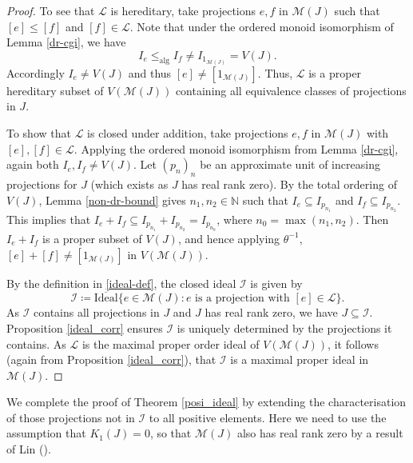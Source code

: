\documentclass[reqno]{amsart}
\theoremstyle{definition}
\theoremstyle{remark}
\numberwithin{equation}{section}
\theoremstyle{definition}
\newcommand{\calM}{\mathcal{M}}
\newcommand{\calL}{\mathcal{L}}
\newcommand{\calI}{\mathcal{I}}
\begin{document}
\begin{proof} 
To see that $\calL$ is hereditary, take projections $e, f$ in $\calM(J)$ such that $[e]\leq [f]$ and $[f]\in \calL$. Note that under the ordered monoid isomorphism of Lemma \ref{dr-cgi}, we have 
\begin{equation} 
I_{e} \leq_{\text{alg}} I_{f}\neq I_{1_{\mathcal M(J)}} = V(J). 
\end{equation} 
Accordingly $I_{e}\neq V(J)$ and thus $[e]\neq [1_{\calM(J)}]$. Thus, $\calL$ is a proper hereditary subset of $V(\calM(J))$ containing all equivalence classes of projections in $J$. 

To show that $\calL$ is closed under addition, take projections $e,f$ in $\calM(J)$ with $[e], [f]\in \calL$. Applying the ordered monoid isomorphism from Lemma \ref{dr-cgi}, again both $I_{e}, I_{f} \neq V(J)$. Let $(p_n)_n$ be an approximate unit of increasing projections for $J$ (which exists as $J$ has real rank zero). By the total ordering of $V(J)$, Lemma \ref{non-dr-bound} gives $n_{1}, n_{2}\in\mathbb N$ such that $I_{e}\subseteq I_{p_{n_{1}}}$ and $I_{f}\subseteq I_{p_{n_{2}}}$. This implies that $I_{e}+I_{f} \subseteq I_{p_{n_{1}}} + I_{p_{n_{2}}} = I_{p_{n_{0}}}$, where $n_{0}=\max(n_1,n_2)$. Then $I_e+I_f$ is a proper subset of $V(J)$, and hence applying $\theta^{-1}$, $[e]+[f]\neq [1_{\calM(J)}]$ in $V(\calM(J))$. 

By the definition in \eqref{ideal-def}, the closed ideal $\calI$ is given by 
\begin{equation} \label{I_0_defn}  
\calI \coloneqq \overline{\text{Ideal}} \{e\in \calM(J): e \text{ is a projection with } [e]\in \calL\}. 
\end{equation} 
As $\calI$ contains all projections in $J$ and $J$ has real rank zero, we have $J\subseteq \calI$. Proposition \ref{ideal_corr} ensures $\calI$ is uniquely determined by the projections it contains. As $\calL$ is the maximal proper order ideal of $V(\calM(J))$, it follows (again from Proposition \ref{ideal_corr}), that $\calI$ is a maximal proper ideal in $\calM(J)$. 
\end{proof} 

We complete the proof of Theorem \ref{posi_ideal} by extending the characterisation of those projections not in $\calI$ to all positive elements. Here we need to use the assumption that  $K_1(J)=0$, so that $\calM(J)$ also has real rank zero by a result of Lin (\cite{RR-LHX}).
\end{document}
